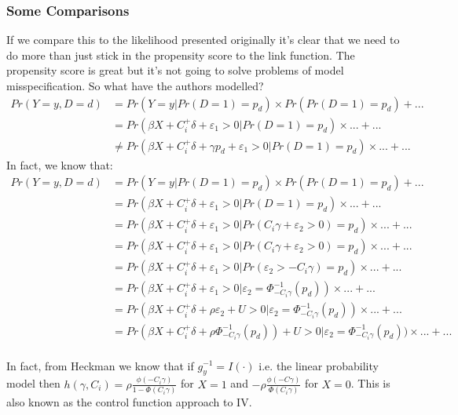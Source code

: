 \documentclass{article}
\begin{document}
\subsubsection*{Some Comparisons}
If we compare this to the likelihood presented originally it's clear that we need 
to do more than just stick in the propensity score to the link function. The 
propensity score is great but it's not going to solve 
problems of model misspecification. So what have the authors modelled?
\begin{align*}
    Pr(Y = y, D = d) &=  Pr(Y = y | Pr(D = 1) = p_d) \times Pr(Pr(D = 1) = p_d) + ...\\
    &= Pr(\beta X + C_i^+\delta + \varepsilon_1 > 0 | Pr(D = 1) = p_d) \times ...  + ...\\
    &\neq Pr(\beta X + C_i^+ \delta + \gamma p_d + \varepsilon_1 > 0 | Pr(D =  1) = p_d) \times ... + ...
\end{align*}
In fact, we know that:
\begin{align*}
    Pr(Y = y, D = d) &=  Pr(Y = y | Pr(D = 1) = p_d) \times Pr(Pr(D = 1) = p_d) + ...\\
    &= Pr(\beta X + C_i^+\delta + \varepsilon_1 > 0 | Pr(D = 1) = p_d) \times ... + ... \\
    &= Pr(\beta X + C_i^+\delta + \varepsilon_1 > 0 | Pr(C_i \gamma + \varepsilon_2 > 0) = p_d) \times ...  + ...\\
    &= Pr(\beta X + C_i^+\delta + \varepsilon_1 > 0 | Pr(C_i \gamma + \varepsilon_2 > 0) = p_d) \times ...  + ...\\
    &= Pr(\beta X + C_i^+\delta + \varepsilon_1 > 0 | Pr(\varepsilon_2 > -C_i \gamma) = p_d) \times ...  + ...\\
    &= Pr(\beta X + C_i^+\delta + \varepsilon_1 > 0 | \varepsilon_2  = \Phi^{-1}_{-C_i\gamma}\left(p_d\right)) \times ...  + ...\\
    &= Pr(\beta X + C_i^+\delta + \rho \varepsilon_2  + U > 0 | \varepsilon_2  = \Phi^{-1}_{-C_i\gamma}\left(p_d\right)) \times ...  + ...\\
    &= Pr(\beta X + C_i^+\delta + \rho\Phi^{-1}_{-C_i\gamma}\left(p_d\right))  + U > 0 | \varepsilon_2  = \Phi^{-1}_{-C_i\gamma}\left(p_d\right)) \times ...  + ...\\
\end{align*}




In fact, 
from Heckman we know that if $g_y^{-1} = I(\cdot)$ i.e. the linear probability model
then $h(\gamma, C_i) = \rho \frac{\phi(-C_i\gamma)}{1 - \Phi(C_i \gamma)}$ for $X = 1$ 
and $-\rho \frac{\phi(-C\gamma)}{\Phi(C_i \gamma)}$ for $X = 0$. This is also known 
as the control function approach to IV.
\end{document}
